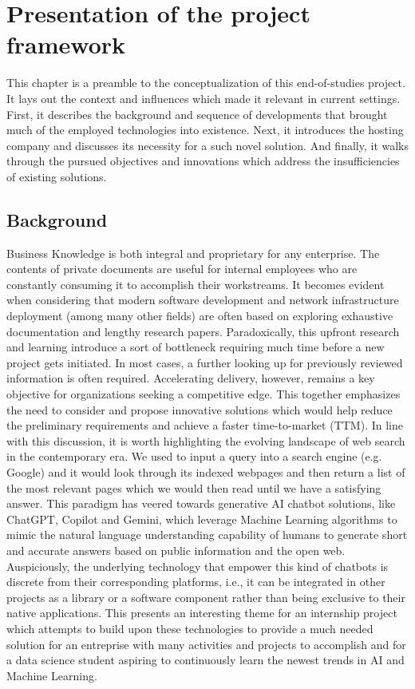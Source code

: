 \chapter{Presentation of the project framework}
This chapter is a preamble to the conceptualization of this end-of-studies project. It lays out the context and influences which made it relevant in current settings.\newline
First, it describes the background and sequence of developments that brought much of the employed technologies into existence. Next, it introduces the hosting company and discusses its necessity for a such novel solution. And finally, it walks through the pursued objectives and innovations which address the insufficiencies of existing solutions.
\newpage

\section{Background}
Business Knowledge is both integral and proprietary for any enterprise. The contents of private documents are useful for internal employees who are constantly consuming it to accomplish their workstreams. It becomes evident when considering that modern software development and network infrastructure deployment (among many other fields) are often based on exploring exhaustive documentation and lengthy research papers. Paradoxically, this upfront research and learning introduce a sort of bottleneck requiring much time before a new project gets initiated. In most cases, a further looking up for previously reviewed information is often required. Accelerating delivery, however, remains a key objective for organizations seeking a competitive edge. This together emphasizes the need to consider and propose innovative solutions which would help reduce the preliminary requirements and achieve a faster time-to-market (TTM).\bigskip\newline
In line with this discussion, it is worth highlighting the evolving landscape of web search in the contemporary era. We used to input a query into a search engine (e.g. Google) and it would look through its indexed webpages and then return a list of the most relevant pages which we would then read until we have a satisfying answer. This paradigm has veered towards generative AI chatbot solutions, like ChatGPT, Copilot and Gemini, which leverage Machine Learning algorithms to mimic the natural language understanding capability of humans to generate short and accurate answers based on public information and the open web.\smallskip\newline
Auspiciously, the underlying technology that empower this kind of chatbots is discrete from their corresponding platforms, i.e., it can be integrated in other projects as a library or a software component rather than being exclusive to their native applications. This presents an interesting theme for an internship project which attempts to build upon these technologies to provide a much needed solution for an entreprise with many activities and projects to accomplish and for a data science student aspiring to continuously learn the newest trends in AI and Machine Learning.
\newpage

